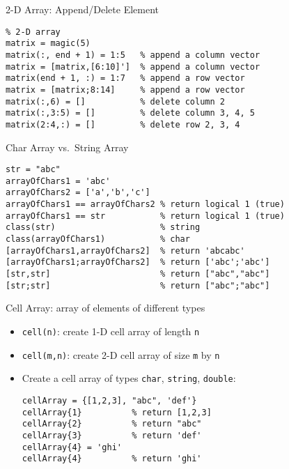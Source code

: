 \begin{frame}[fragile]{2-D Array: Append/Delete Element}
\protect\hypertarget{d-array-appenddelete-element-1}{}
\begin{verbatim}
% 2-D array
matrix = magic(5)
matrix(:, end + 1) = 1:5   % append a column vector
matrix = [matrix,[6:10]']  % append a column vector
matrix(end + 1, :) = 1:7   % append a row vector
matrix = [matrix;8:14]     % append a row vector
matrix(:,6) = []           % delete column 2
matrix(:,3:5) = []         % delete column 3, 4, 5
matrix(2:4,:) = []         % delete row 2, 3, 4
\end{verbatim}
\end{frame}

\begin{frame}[fragile]{Char Array vs.~String Array}
\protect\hypertarget{char-array-vs.-string-array}{}
\begin{verbatim}
str = "abc"
arrayOfChars1 = 'abc'
arrayOfChars2 = ['a','b','c']
arrayOfChars1 == arrayOfChars2 % return logical 1 (true)
arrayOfChars1 == str           % return logical 1 (true)
class(str)                     % string
class(arrayOfChars1)           % char
[arrayOfChars1,arrayOfChars2]  % return 'abcabc'
[arrayOfChars1;arrayOfChars2]  % return ['abc';'abc']
[str,str]                      % return ["abc","abc"]
[str;str]                      % return ["abc";"abc"]
\end{verbatim}
\end{frame}

\begin{frame}[fragile]{Cell Array: array of elements of different types}
\protect\hypertarget{cell-array-array-of-elements-of-different-types}{}
\begin{itemize}[<+->]
\item
  \texttt{cell(n)}: create 1-D cell array of length \texttt{n}
\item
  \texttt{cell(m,n)}: create 2-D cell array of size \texttt{m} by
  \texttt{n}
\item
  Create a cell array of types \texttt{char}, \texttt{string},
  \texttt{double}:

\begin{verbatim}
cellArray = {[1,2,3], "abc", 'def'}
cellArray{1}          % return [1,2,3]
cellArray{2}          % return "abc"
cellArray{3}          % return 'def'
cellArray{4} = 'ghi'
cellArray{4}          % return 'ghi'
\end{verbatim}
\end{itemize}
\end{frame}

